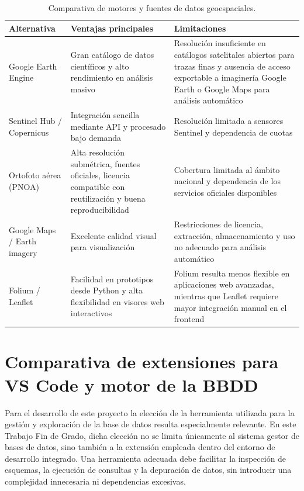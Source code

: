 \begin{table}[h]
	\centering
	\renewcommand{\arraystretch}{1.3}
	\begin{tabular}{p{3 cm} p{4 cm} p{5 cm}}
		\hline
		\textbf{Alternativa} & \textbf{Ventajas principales} & \textbf{Limitaciones} \\
		\hline
		Google Earth Engine & Gran catálogo de datos científicos y alto rendimiento en análisis masivo & Resolución insuficiente en catálogos satelitales abiertos para trazas finas y ausencia de acceso exportable a imaginería Google Earth o Google Maps para análisis automático \\
		\hline
		Sentinel Hub / Copernicus & Integración sencilla mediante API y procesado bajo demanda & Resolución limitada a sensores Sentinel y dependencia de cuotas \\
		\hline
		Ortofoto aérea (PNOA) & Alta resolución submétrica, fuentes oficiales, licencia compatible con reutilización y buena reproducibilidad & Cobertura limitada al ámbito nacional y dependencia de los servicios oficiales disponibles \\
		\hline
		Google Maps / Earth imagery & Excelente calidad visual para visualización & Restricciones de licencia, extracción, almacenamiento y uso no adecuado para análisis automático \\
		\hline
		Folium / Leaflet & Facilidad en prototipos desde Python y alta flexibilidad en visores web interactivos & Folium resulta menos flexible en aplicaciones web avanzadas, mientras que Leaflet requiere mayor integración manual en el frontend \\
		\hline
	\end{tabular}
	\caption{Comparativa de motores y fuentes de datos geoespaciales.}
	\label{tab:comparativa_engines}
\end{table}

\section{Comparativa de extensiones para VS Code y motor de la BBDD}

Para el desarrollo de este proyecto la elección de la herramienta utilizada para la gestión y exploración de la base de datos resulta especialmente relevante. En este Trabajo Fin de Grado, dicha elección no se limita únicamente al sistema gestor de bases de datos, sino también a la extensión empleada dentro del entorno de desarrollo integrado. Una herramienta adecuada debe facilitar la inspección de esquemas, la ejecución de consultas y la depuración de datos, sin introducir una complejidad innecesaria ni dependencias excesivas.

